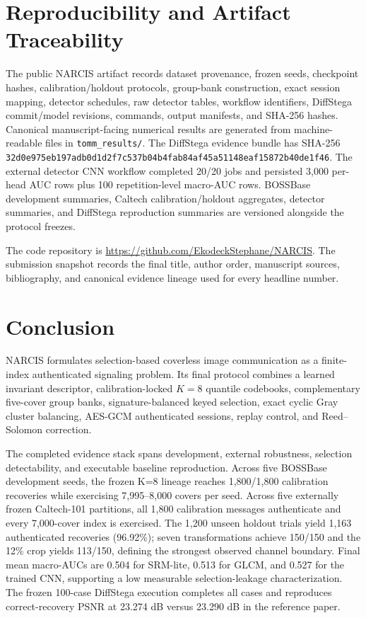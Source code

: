\section{Reproducibility and Artifact Traceability}
\label{sec:repro}

The public NARCIS artifact records dataset provenance, frozen seeds, checkpoint hashes, calibration/holdout protocols, group-bank construction, exact session mapping, detector schedules, raw detector tables, workflow identifiers, DiffStega commit/model revisions, commands, output manifests, and SHA-256 hashes. Canonical manuscript-facing numerical results are generated from machine-readable files in \texttt{tomm\_results/}. The DiffStega evidence bundle has SHA-256 \texttt{32d0e975eb197adb0d1d2f7c537b04b4fab84af45a51148eaf15872b40de1f46}. The external detector CNN workflow completed 20/20 jobs and persisted 3,000 per-head AUC rows plus 100 repetition-level macro-AUC rows. BOSSBase development summaries, Caltech calibration/holdout aggregates, detector summaries, and DiffStega reproduction summaries are versioned alongside the protocol freezes.

The code repository is \url{https://github.com/EkodeckStephane/NARCIS}. The submission snapshot records the final title, author order, manuscript sources, bibliography, and canonical evidence lineage used for every headline number.

\section{Conclusion}
\label{sec:conclusion}

NARCIS formulates selection-based coverless image communication as a finite-index authenticated signaling problem. Its final protocol combines a learned invariant descriptor, calibration-locked $K=8$ quantile codebooks, complementary five-cover group banks, signature-balanced keyed selection, exact cyclic Gray cluster balancing, AES-GCM authenticated sessions, replay control, and Reed--Solomon correction.

The completed evidence stack spans development, external robustness, selection detectability, and executable baseline reproduction. Across five BOSSBase development seeds, the frozen K=8 lineage reaches 1,800/1,800 calibration recoveries while exercising 7,995--8,000 covers per seed. Across five externally frozen Caltech-101 partitions, all 1,800 calibration messages authenticate and every 7,000-cover index is exercised. The 1,200 unseen holdout trials yield 1,163 authenticated recoveries (96.92\%); seven transformations achieve 150/150 and the 12\% crop yields 113/150, defining the strongest observed channel boundary. Final mean macro-AUCs are 0.504 for SRM-lite, 0.513 for GLCM, and 0.527 for the trained CNN, supporting a low measurable selection-leakage characterization. The frozen 100-case DiffStega execution completes all cases and reproduces correct-recovery PSNR at 23.274 dB versus 23.290 dB in the reference paper.

